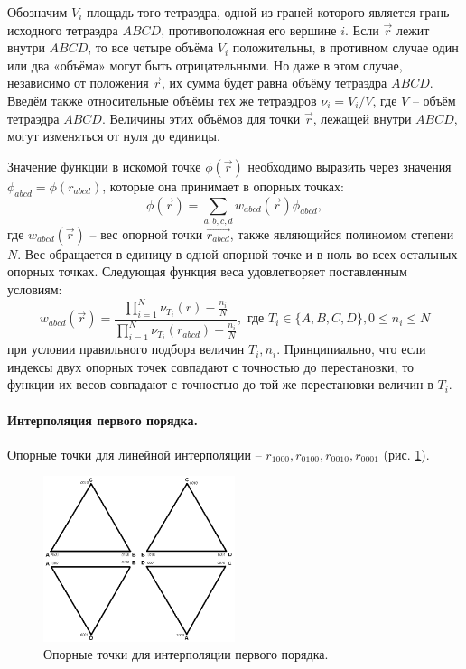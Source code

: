 Обозначим $V_i$ площадь того тетраэдра, одной из граней которого является грань исходного тетраэдра $ABCD$, противоположная его вершине $i$. Если $\vec{r}$ лежит внутри $ABCD$, то все четыре объёма $V_i$ положительны, в противном случае один или два «объёма» могут быть отрицательными. Но даже в этом случае, независимо от положения $\vec{r}$, их сумма будет равна объёму тетраэдра $ABCD$. Введём также относительные объёмы тех же тетраэдров $\nu_i = V_i / V$, где $V$ -- объём тетраэдра $ABCD$. Величины этих объёмов для точки $\vec{r}$, лежащей внутри $ABCD$, могут изменяться от нуля до единицы.

Значение функции в искомой точке $\phi(\vec{r})$ необходимо выразить через значения $\phi_{abcd} = \phi(r_{abcd})$, которые она принимает в опорных точках:
\begin{equation}
\phi(\vec{r}) = \sum_{a,b,c,d}{w_{abcd}(\vec{r}) \phi_{abcd}},
\end{equation}
где $w_{abcd}(\vec{r})$ -- вес опорной точки $\vec{r_{abcd}}$, также являющийся полиномом степени $N$. Вес обращается в единицу в одной опорной точке и в ноль во всех остальных опорных точках. Следующая функция веса удовлетворяет поставленным условиям:
\begin{equation}
w_{abcd}(\vec{r}) = \frac{ \prod_{i=1}^N{\nu_{T_i}(r) - \frac{n_i}{N}} }{ \prod_{i=1}^N{\nu_{T_i}(r_{abcd}) - \frac{n_i}{N}} }, \textrm{ где } T_i \in \{A, B, C, D\}, 0 \le n_i \le N
\end{equation}
при условии правильного подбора величин ${T_i}, {n_i}$. Принципиально, что если индексы двух опорных точек совпадают с точностью до перестановки, то функции их весов совпадают с точностью до той же перестановки величин в ${T_i}$.

\paragraph{Интерполяция первого порядка.} Опорные точки для линейной интерполяции -- $r_{1000}, r_{0100}, r_{0010}, r_{0001}$ (рис. \ref{pic:tetr-interpolation-1st-order-1}).

\begin{figure}[h]
\centering
\includegraphics[width=0.5\textwidth]{png/tetr-interp-1st-order-1.png}
\caption{Опорные точки для интерполяции первого порядка.}
\label{pic:tetr-interpolation-1st-order-1}
\end{figure}

